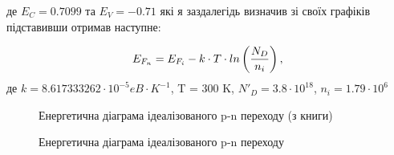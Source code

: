 \documentclass[14pt,a4paper]{scrartcl}
\begin{document}
 де  $E_C=0.7099$ та $E_V=-0.71$  які я заздалегідь визначив зі своїх графіків підставивши отримав наступне:
 
 \begin{equation}
E_{F_{n}} = E_{F_{i}} - k\cdot T\cdot ln\left(\dfrac{N_D}{n_i} \right),\\
\end{equation}
де $k = 8.617333262\cdot10^{-5} eB\cdot K^{-1}$, T = 300 K, $N'_D = 3.8\cdot10^{18}$, $n_i = 1.79\cdot10^6$


\begin{center}
\begin{figure}[h]
\caption{Енергетична діаграма ідеалізованого p-n переходу (з книги)}
\label{ris:image3}
\end{figure}
\end{center}

\begin{center}
\begin{figure}[h]
\caption{Енергетична діаграма ідеалізованого p-n переходу}
\label{ris:image4}
\end{figure}
\end{center}
\end{document}

